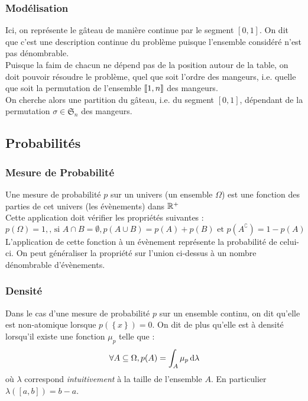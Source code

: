 \documentclass{beamercours}
\begin{document}
\begin{frame}
    \frametitle{Modélisation}
     {Ici, on représente le gâteau de manière continue par le segment $\left[0, 1\right]$. On dit que c'est une description continue du problème puisque l'ensemble considéré n'est pas dénombrable.\\}
     {Puisque la faim de chacun ne dépend pas de la position autour de la table, on doit pouvoir résoudre le problème, quel que soit l'ordre des mangeurs, i.e. quelle que soit la permutation de l'ensemble $\left\llbracket 1, n\right\rrbracket$ des mangeurs. \\}
     {On cherche alors une partition du gâteau, i.e. du segment $\left[0, 1\right]$, dépendant de la permutation $\sigma \in \mathfrak{S}_{n}$ des mangeurs.}
\end{frame}

\subsection{Probabilités}
\begin{frame}
    \frametitle{Mesure de Probabilité}
     {Une mesure de probabilité $p$ sur un univers (un ensemble $\Omega$) est une fonction des parties de cet univers (les évènements) dans $\mathbb{R}^{+}$ \\}
     {Cette application doit vérifier les propriétés suivantes : 
    \[
        p(\Omega) = 1, \text{, si } A \cap B = \emptyset, p(A \cup B) = p(A) + p(B) \text{ et } p(A^{\complement}) = 1 - p(A)
    \]}
     {L'application de cette fonction à un évènement représente la probabilité de celui-ci. On peut généraliser la propriété sur l'union ci-dessus à un nombre dénombrable d'évènements. }
\end{frame}

\begin{frame}
    \frametitle{Densité}
     {Dans le cas d'une mesure de probabilité $p$ sur un ensemble continu, on dit qu'elle est non-atomique lorsque $p(\left\{x\right\}) = 0$.}
     {On dit de plus qu'elle est à densité lorsqu'il existe une fonction $\mu_{p}$ telle que : 
    \[
        \forall A \subseteq \Omega, p(A) = \int_{A} \mu_{p} {\, \rm d}\lambda
    \]
    où $\lambda$ correspond \textit{intuitivement} à la taille de l'ensemble $A$. En particulier $\lambda(\left[a, b\right]) = b - a$.}
\end{frame}
\end{document}
